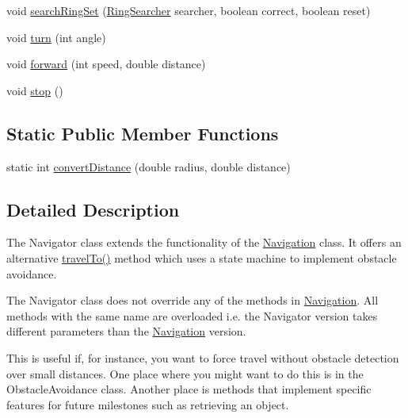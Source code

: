 \begin{DoxyCompactItemize}
\item 
void \hyperlink{classca_1_1mcgill_1_1ecse211_1_1project_1_1_navigation_a1a808e665b8dd5b8e79b0580724d239c}{search\+Ring\+Set} (\hyperlink{classca_1_1mcgill_1_1ecse211_1_1project_1_1_ring_searcher}{Ring\+Searcher} searcher, boolean correct, boolean reset)
\item 
void \hyperlink{classca_1_1mcgill_1_1ecse211_1_1project_1_1_navigation_ad74286ad36d333bfaf57661837457b76}{turn} (int angle)
\item 
void \hyperlink{classca_1_1mcgill_1_1ecse211_1_1project_1_1_navigation_a7c66610c5b7496ddb35d342ab2cd3f08}{forward} (int speed, double distance)
\item 
void \hyperlink{classca_1_1mcgill_1_1ecse211_1_1project_1_1_navigation_ae8530d181ffd790ff9dea5eeab54b1a1}{stop} ()
\end{DoxyCompactItemize}
\subsection*{Static Public Member Functions}
\begin{DoxyCompactItemize}
\item 
static int \hyperlink{classca_1_1mcgill_1_1ecse211_1_1project_1_1_navigation_ac9e260bcd619ffa4820d7d0de7ea1c12}{convert\+Distance} (double radius, double distance)
\end{DoxyCompactItemize}


\subsection{Detailed Description}
The Navigator class extends the functionality of the \hyperlink{classca_1_1mcgill_1_1ecse211_1_1project_1_1_navigation}{Navigation} class. It offers an alternative \hyperlink{classca_1_1mcgill_1_1ecse211_1_1project_1_1_navigation_a3d8354490a2d8c36090d794c25d33421}{travel\+To()} method which uses a state machine to implement obstacle avoidance.

The Navigator class does not override any of the methods in \hyperlink{classca_1_1mcgill_1_1ecse211_1_1project_1_1_navigation}{Navigation}. All methods with the same name are overloaded i.\+e. the Navigator version takes different parameters than the \hyperlink{classca_1_1mcgill_1_1ecse211_1_1project_1_1_navigation}{Navigation} version.

This is useful if, for instance, you want to force travel without obstacle detection over small distances. One place where you might want to do this is in the Obstacle\+Avoidance class. Another place is methods that implement specific features for future milestones such as retrieving an object.

